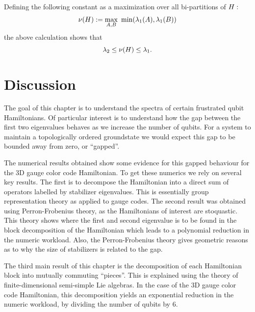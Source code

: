 Defining the following constant as a maximization over
all bi-partitions of $H:$
$$
    \nu(\Ham) := \max_{A, B}\ \mbox{min}(\lambda_1(A), \lambda_1(B))
$$
the above calculation shows that
$$
    \lambda_2 \le \nu(H) \le \lambda_1.
$$


\section{Discussion}


The goal of this chapter is to understand the spectra of
certain frustrated qubit Hamiltonians. Of particular interest is
to understand how 
the gap between the first two eigenvalues behaves as we 
increase the number of qubits.
For a system to maintain a topologically ordered groundstate
we would expect this gap to be bounded away from zero, or ``gapped''.

The numerical results obtained show some evidence for
this gapped behaviour for the 3D gauge color code Hamiltonian.
To get these numerics we rely on several key results.
The first is to decompose the Hamiltonian into a direct sum
of operators labelled by stabilizer eigenvalues.
This is essentially group representation theory as applied to
gauge codes.
The second result was obtained using Perron-Frobenius theory, as the
Hamiltonians of interest are stoquastic.
This theory shows where the first and second eigenvalue
is to be found in the block decomposition of the Hamiltonian
which leads to a polynomial reduction in the numeric workload.
Also, the Perron-Frobenius theory gives geometric reasons as to
why the size of stabilizers is related to the gap.

The third main result of this chapter is the decomposition of
each Hamiltonian block into mutually commuting ``pieces''.
This is explained using the theory of finite-dimensional semi-simple
Lie algebras.
In the case of the 3D gauge color code Hamiltonian, this
decomposition yields an exponential reduction in 
the numeric workload, by dividing the number of qubits by 6.

